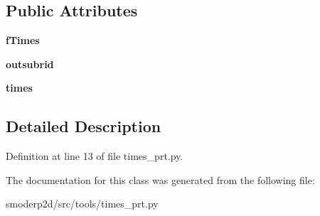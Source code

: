 \subsection*{Public Attributes}
\begin{DoxyCompactItemize}
\item 
\hypertarget{classsmoderp2d_1_1src_1_1tools_1_1times__prt_1_1TimesPrt_a169eae410f43ff85b68f5bf5306e3acb}{{\bfseries f\-Times}}\label{classsmoderp2d_1_1src_1_1tools_1_1times__prt_1_1TimesPrt_a169eae410f43ff85b68f5bf5306e3acb}

\item 
\hypertarget{classsmoderp2d_1_1src_1_1tools_1_1times__prt_1_1TimesPrt_ad38d98b1f1e7bb24eccb06acb8252856}{{\bfseries outsubrid}}\label{classsmoderp2d_1_1src_1_1tools_1_1times__prt_1_1TimesPrt_ad38d98b1f1e7bb24eccb06acb8252856}

\item 
\hypertarget{classsmoderp2d_1_1src_1_1tools_1_1times__prt_1_1TimesPrt_a4f3c75594d01d3d5dbee4244edd4fb64}{{\bfseries times}}\label{classsmoderp2d_1_1src_1_1tools_1_1times__prt_1_1TimesPrt_a4f3c75594d01d3d5dbee4244edd4fb64}

\end{DoxyCompactItemize}


\subsection{Detailed Description}


Definition at line 13 of file times\-\_\-prt.\-py.



The documentation for this class was generated from the following file\-:\begin{DoxyCompactItemize}
\item 
smoderp2d/src/tools/times\-\_\-prt.\-py\end{DoxyCompactItemize}
